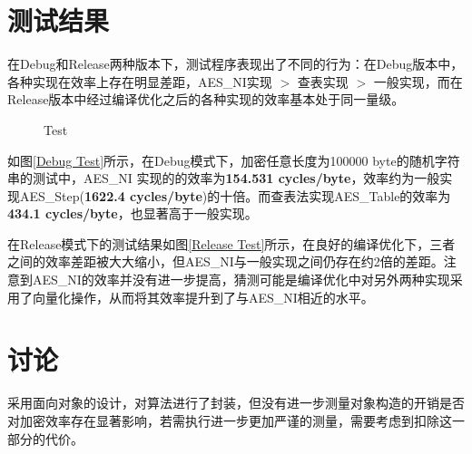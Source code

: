 \documentclass{article} %
\begin{document}
\begin{CJK}{UTF8}{gbsn}
\section{测试结果}
在Debug和Release两种版本下，测试程序表现出了不同的行为：在Debug版本中，各种实现在效率上存在明显差距，AES\_NI实现 $>$ 查表实现 $>$ 一般实现，而在Release版本中经过编译优化之后的各种实现的效率基本处于同一量级。
\begin{figure}[H]
	\centering
	\label{Test}
    \caption{Test}
\end{figure}
如图\ref{Debug Test}所示，在Debug模式下，加密任意长度为100000 byte的随机字符串的测试中，AES\_NI 实现的的效率为\textbf{154.531 cycles/byte}，效率约为一般实现AES\_Step(\textbf{1622.4 cycles/byte})的十倍。而查表法实现AES\_Table的效率为\textbf{434.1 cycles/byte}，也显著高于一般实现。

在Release模式下的测试结果如图\ref{Release Test}所示，在良好的编译优化下，三者之间的效率差距被大大缩小，但AES\_NI与一般实现之间仍存在约2倍的差距。注意到AES\_NI的效率并没有进一步提高，猜测可能是编译优化中对另外两种实现采用了向量化操作，从而将其效率提升到了与AES\_NI相近的水平。
\section{讨论}
	采用面向对象的设计，对算法进行了封装，但没有进一步测量对象构造的开销是否对加密效率存在显著影响，若需执行进一步更加严谨的测量，需要考虑到扣除这一部分的代价。


\end{CJK}
\end{document}
